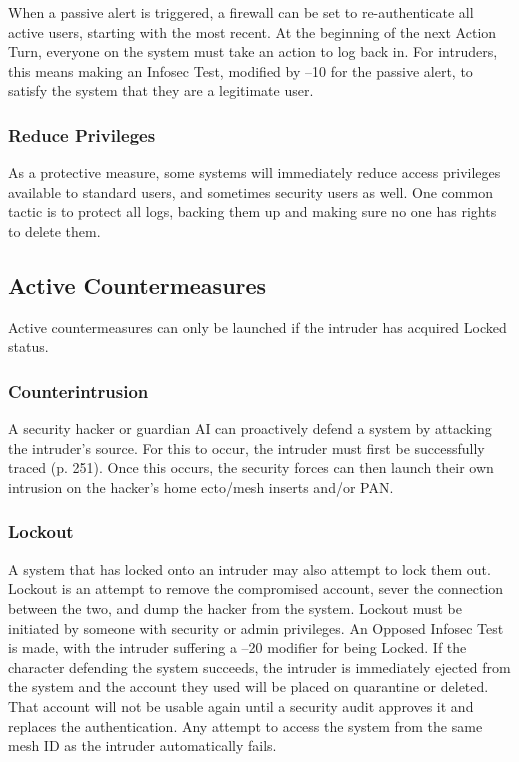 When a passive alert is triggered, a firewall can be set to re-authenticate all active users, starting with the most recent. At the beginning of the next Action Turn, everyone on the system must take an action to log back in. For intruders, this means making an Infosec Test, modified by –10 for the passive alert, to satisfy the system that they are a legitimate user. 

\subsubsection{Reduce Privileges} 

As a protective measure, some systems will immediately reduce access privileges available to standard users, and sometimes security users as well. One common tactic is to protect all logs, backing them up and making sure no one has rights to delete them. 

\subsection{Active Countermeasures} 

Active countermeasures can only be launched if the intruder has acquired Locked status. 

\subsubsection{Counterintrusion} 

A security hacker or guardian AI can proactively defend a system by attacking the intruder's source. For this to occur, the intruder must first be successfully traced (p. 251). Once this occurs, the security forces can then launch their own intrusion on the hacker's home ecto/mesh inserts and/or PAN. 

\subsubsection{Lockout} 

A system that has locked onto an intruder may also attempt to lock them out. Lockout is an attempt to remove the compromised account, sever the connection between the two, and dump the hacker from the system. Lockout must be initiated by someone with security or admin privileges. An Opposed Infosec Test is made, with the intruder suffering a –20 modifier for being Locked. If the character defending the system succeeds, the intruder is immediately ejected from the system and the account they used will be placed on quarantine or deleted. That account will not be usable again until a security audit approves it and replaces the authentication. Any attempt to access the system from the same mesh ID as the intruder automatically fails. 

